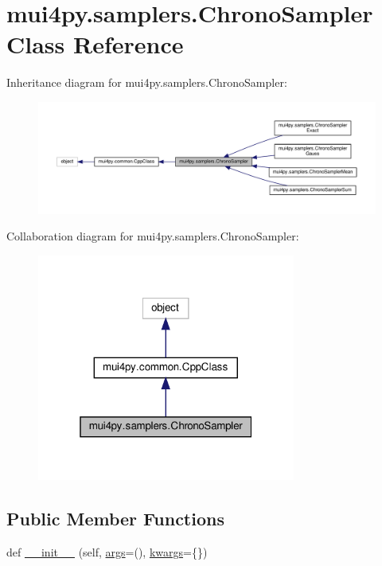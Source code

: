 \hypertarget{classmui4py_1_1samplers_1_1_chrono_sampler}{}\section{mui4py.\+samplers.\+Chrono\+Sampler Class Reference}
\label{classmui4py_1_1samplers_1_1_chrono_sampler}


Inheritance diagram for mui4py.\+samplers.\+Chrono\+Sampler\+:
\nopagebreak
\begin{figure}[H]
\begin{center}
\leavevmode
\includegraphics[width=350pt]{classmui4py_1_1samplers_1_1_chrono_sampler__inherit__graph}
\end{center}
\end{figure}


Collaboration diagram for mui4py.\+samplers.\+Chrono\+Sampler\+:
\nopagebreak
\begin{figure}[H]
\begin{center}
\leavevmode
\includegraphics[width=241pt]{classmui4py_1_1samplers_1_1_chrono_sampler__coll__graph}
\end{center}
\end{figure}
\subsection*{Public Member Functions}
\begin{DoxyCompactItemize}
\item 
def \hyperlink{classmui4py_1_1samplers_1_1_chrono_sampler_a2991d523966ed5846bf0210a7e3d5f0e}{\+\_\+\+\_\+init\+\_\+\+\_\+} (self, \hyperlink{classmui4py_1_1common_1_1_cpp_class_a29797823c6e21f22bba24ee7d35ef31d}{args}=(), \hyperlink{classmui4py_1_1common_1_1_cpp_class_af43879f06f07b1abf0d08e30c5ead46f}{kwargs}=\{\})
\end{DoxyCompactItemize}
